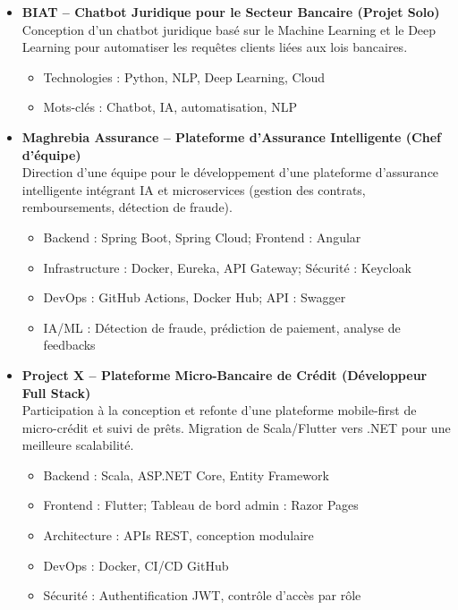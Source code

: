 \documentclass[paper=a4,fontsize=11pt]{scrartcl}
\begin{document}
\begin{itemize}
    \item \textbf{BIAT – Chatbot Juridique pour le Secteur Bancaire (Projet Solo)} \\
    Conception d’un chatbot juridique basé sur le Machine Learning et le Deep Learning pour automatiser les requêtes clients liées aux lois bancaires.
    \begin{itemize}
        \item Technologies : Python, NLP, Deep Learning, Cloud
        \item Mots-clés : Chatbot, IA, automatisation, NLP
    \end{itemize}

    \item \textbf{Maghrebia Assurance – Plateforme d’Assurance Intelligente (Chef d’équipe)} \\
    Direction d’une équipe pour le développement d’une plateforme d’assurance intelligente intégrant IA et microservices (gestion des contrats, remboursements, détection de fraude).
    \begin{itemize}
        \item Backend : Spring Boot, Spring Cloud; Frontend : Angular
        \item Infrastructure : Docker, Eureka, API Gateway; Sécurité : Keycloak
        \item DevOps : GitHub Actions, Docker Hub; API : Swagger
        \item IA/ML : Détection de fraude, prédiction de paiement, analyse de feedbacks
    \end{itemize}

    \item \textbf{Project X – Plateforme Micro-Bancaire de Crédit (Développeur Full Stack)} \\
    Participation à la conception et refonte d’une plateforme mobile-first de micro-crédit et suivi de prêts. Migration de Scala/Flutter vers .NET pour une meilleure scalabilité.
\begin{itemize}
    \item Backend : Scala, ASP.NET Core, Entity Framework
    \item Frontend : Flutter; Tableau de bord admin : Razor Pages
    \item Architecture : APIs REST, conception modulaire
    \item DevOps : Docker, CI/CD GitHub
    \item Sécurité : Authentification JWT, contrôle d’accès par rôle
\end{itemize}


\end{itemize}
\end{document}
